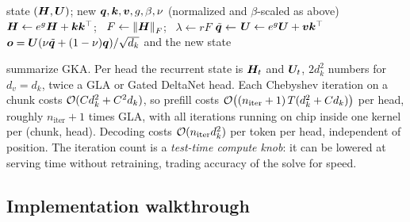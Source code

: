 \begin{algorithm}[t]
\caption{GKA decode (one token, one head)}\label{alg:c08-gka-decode}
\begin{algorithmic}[1]
\Require state $(\bm{H},\bm{U})$; new $\bm{q},\bm{k},\bm{v},g,\beta,\nu$ (normalized and $\beta$-scaled as above)
\State $\bm{H}\gets e^{g}\bm{H}+\bm{k}\bm{k}^{\top}$; \ $F\gets\left\lVert \bm{H}\right\rVert_F$; \ $\lambda\gets rF$
\State $\tilde{\bm{q}}\gets$ 
\State $\bm{U}\gets e^{g}\bm{U}+\bm{v}\bm{k}^{\top}$
\State \Return $\bm{o}=\bm{U}(\nu\tilde{\bm{q}}+(1-\nu)\bm{q})/\sqrt{d_k}$ and the new state
\end{algorithmic}
\end{algorithm}

 summarize GKA. Per head the recurrent state is
$\bm{H}_t$ and $\bm{U}_t$, $2d_k^2$ numbers for $d_v=d_k$, twice a GLA or Gated DeltaNet head. Each
Chebyshev iteration on a chunk costs $\mathcal{O}(Cd_k^2+C^2d_k)$, so prefill costs
$\mathcal{O}\bigl((n_\text{iter}+1)\,T(d_k^2+Cd_k)\bigr)$ per head, roughly $n_\text{iter}+1$ times GLA,
with all iterations running on chip inside one kernel per (chunk, head). Decoding costs
$\mathcal{O}(n_\text{iter}d_k^2)$ per token per head, independent of position. The iteration count is a
\emph{test-time compute knob}: it can be lowered at serving time without retraining, trading
accuracy of the solve for speed.

\subsection{Implementation walkthrough}

